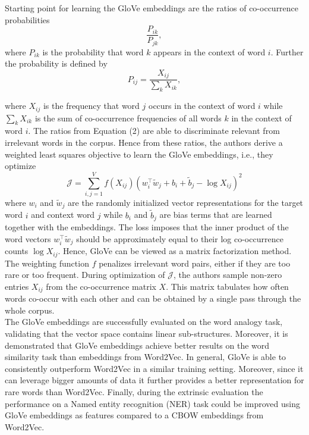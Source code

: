 \documentclass[11pt, a4paper]{amsart}
\begin{document}
Starting point for learning the GloVe embeddings are the ratios of co-occurrence probabilities
\begin{equation}
	\frac{P_{ik}}{P_{jk}},
\end{equation}
where $P_{ik}$ is the probability that word $k$ appears in the context of word $i$. Further the probability is defined by
\begin{equation}
	P_{ij} = \frac{X_{ij}}{\sum_{k} X_{ik}},
\end{equation}

where $X_{ij}$ is the frequency that word $j$ occurs in the context of word $i$ while $\sum_{k} X_{ik}$ is the sum of co-occurrence frequencies of all words $k$ in the context of word $i$.
The ratios from Equation (2) are able to discriminate relevant from irrelevant words in the corpus. Hence from these ratios, the authors derive a weighted least squares objective to learn the GloVe embeddings, i.e., they optimize
\begin{equation}
	\mathcal{J} = \sum_{i,j = 1}^V f(X_{ij})(w_i^\top\widetilde{w}_j + b_i + \widetilde{b}_j - \log X_{ij})^2
\end{equation}
where $w_i$ and $\widetilde{w}_j$ are the randomly initialized vector representations for the target word $i$ and context word $j$ while $b_i$ and $\tilde{b}_j$ are bias terms that are learned together with the embeddings. The loss imposes that the inner product of the word vectors $w_i^\top\widetilde{w}_j$ should be approximately equal to their log co-occurrence counts $\log X_{ij}$. Hence, GloVe can be viewed as a matrix factorization method. The weighting function $f$ penalizes irrelevant word pairs, either if they are too rare or too frequent. During optimization of $\mathcal{J}$, the authors sample non-zero entries $X_{ij}$ from the co-occurrence matrix $X$. This matrix tabulates how often words co-occur with each other and can be obtained by a single pass through the whole corpus.\\

The GloVe embeddings are successfully evaluated on the word analogy task, validating that the vector space contains linear sub-structures. Moreover, it is demonstrated that GloVe embeddings achieve better results on the word similarity task than embeddings from Word2Vec. In general, GloVe is able to consistently outperform Word2Vec in a similar training setting. Moreover, since it can leverage bigger amounts of data it further provides a better representation for rare words than Word2Vec. Finally, during the extrinsic evaluation the performance on a Named entity recognition (NER) task could be improved using GloVe embeddings as features compared to a CBOW embeddings from Word2Vec.
\end{document}
